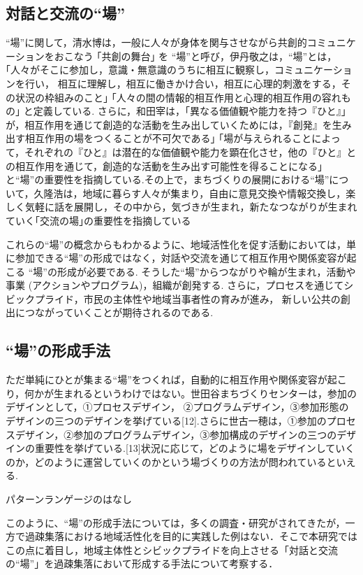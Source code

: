\documentclass[a4paper]{jsarticle}
\begin{document}
\subsection{対話と交流の“場”}
“場”に関して，清水博は，一般に人々が身体を関与させながら共創的コミュニケーションをおこなう ｢共創の舞台｣ を “場”と呼び\cite{9}，伊丹敬之は，“場”とは，｢人々がそこに参加し，意識・無意識のうちに相互に観察し，コミュニケーションを行い， 相互に理解し，相互に働きかけ合い，相互に心理的刺激をする，その状況の枠組みのこと｣ ｢人々の間の情報的相互作用と心理的相互作用の容れもの｣ と定義している\cite{10}. さらに，和田宰は，｢異なる価値観や能力を持つ『ひと』｣ が，相互作用を通じて創造的な活動を生み出していくためには，『創発』を生み出す相互作用の場をつくることが不可欠である｣ ｢場が与えられることによって，それぞれの『ひと』は潜在的な価値観や能力を顕在化させ，他の『ひと』との相互作用を通じて，創造的な活動を生み出す可能性を得ることになる｣ と“場”の重要性を指摘している\cite{11}.その上で，まちづくりの展開における“場”について，久隆浩は，地域に暮らす人々が集まり，自由に意見交換や情報交換し，楽しく気軽に話を展開し，その中から，気づきが生まれ，新たなつながりが生まれていく｢交流の場｣の重要性を指摘している\cite{12}\par
これらの“場”の概念からもわかるように、地域活性化を促す活動においては，単に参加できる“場”の形成ではなく，対話や交流を通じて相互作用や関係変容が起こる “場”の形成が必要である. そうした“場”からつながりや輪が生まれ，活動や事業 (アクションやプログラム)，組織が創発する. さらに，プロセスを通じてシビックプライド，市民の主体性や地域当事者性の育みが進み， 新しい公共の創出につながっていくことが期待されるのである.\par
\subsection{“場”の形成手法}
ただ単純にひとが集まる“場”をつくれば，自動的に相互作用や関係変容が起こり，何かが生まれるというわけではない。世田谷まちづくりセンターは，参加のデザインとして，①プロセスデザイン， ②プログラムデザイン，③参加形態のデザインの三つのデザインを挙げている[12].さらに世古一穂は，①参加のプロセスデザイン，②参加のプログラムデザイン，③参加構成のデザインの三つのデザインの重要性を挙げている.[13]状況に応じて，どのように場をデザインしていくのか，どのように運営していくのかという場づくりの方法が問われているといえる.\par
パターンランゲージのはなし\par



このように、“場”の形成手法については，多くの調査・研究がされてきたが，一方で過疎集落における地域活性化を目的に実践した例はない．そこで本研究ではこの点に着目し，地域主体性とシビックプライドを向上させる「対話と交流の“場”」を過疎集落において形成する手法について考察する．
\end{document}
